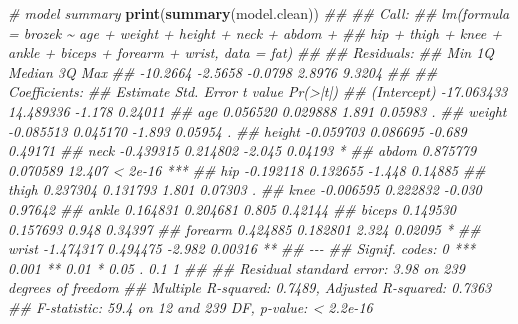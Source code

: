 \documentclass[
]{book}
\newenvironment{Shaded}{\begin{snugshade}}{\end{snugshade}}
\newcommand{\CommentTok}[1]{\textcolor[rgb]{0.56,0.35,0.01}{\textit{#1}}}
\newcommand{\KeywordTok}[1]{\textcolor[rgb]{0.13,0.29,0.53}{\textbf{#1}}}
\newcommand{\NormalTok}[1]{#1}
\theoremstyle{definition}
\theoremstyle{definition}
\theoremstyle{definition}
\theoremstyle{remark}
\begin{document}
\begin{Shaded}
\begin{Highlighting}[]

\CommentTok{\# model summary}
\KeywordTok{print}\NormalTok{(}\KeywordTok{summary}\NormalTok{(model.clean))}
\CommentTok{\#\# }
\CommentTok{\#\# Call:}
\CommentTok{\#\# lm(formula = brozek \textasciitilde{} age + weight + height + neck + abdom + }
\CommentTok{\#\#     hip + thigh + knee + ankle + biceps + forearm + wrist, data = fat)}
\CommentTok{\#\# }
\CommentTok{\#\# Residuals:}
\CommentTok{\#\#      Min       1Q   Median       3Q      Max }
\CommentTok{\#\# {-}10.2664  {-}2.5658  {-}0.0798   2.8976   9.3204 }
\CommentTok{\#\# }
\CommentTok{\#\# Coefficients:}
\CommentTok{\#\#               Estimate Std. Error t value Pr(\textgreater{}|t|)    }
\CommentTok{\#\# (Intercept) {-}17.063433  14.489336  {-}1.178  0.24011    }
\CommentTok{\#\# age           0.056520   0.029888   1.891  0.05983 .  }
\CommentTok{\#\# weight       {-}0.085513   0.045170  {-}1.893  0.05954 .  }
\CommentTok{\#\# height       {-}0.059703   0.086695  {-}0.689  0.49171    }
\CommentTok{\#\# neck         {-}0.439315   0.214802  {-}2.045  0.04193 *  }
\CommentTok{\#\# abdom         0.875779   0.070589  12.407  \textless{} 2e{-}16 ***}
\CommentTok{\#\# hip          {-}0.192118   0.132655  {-}1.448  0.14885    }
\CommentTok{\#\# thigh         0.237304   0.131793   1.801  0.07303 .  }
\CommentTok{\#\# knee         {-}0.006595   0.222832  {-}0.030  0.97642    }
\CommentTok{\#\# ankle         0.164831   0.204681   0.805  0.42144    }
\CommentTok{\#\# biceps        0.149530   0.157693   0.948  0.34397    }
\CommentTok{\#\# forearm       0.424885   0.182801   2.324  0.02095 *  }
\CommentTok{\#\# wrist        {-}1.474317   0.494475  {-}2.982  0.00316 ** }
\CommentTok{\#\# {-}{-}{-}}
\CommentTok{\#\# Signif. codes:  0 \textquotesingle{}***\textquotesingle{} 0.001 \textquotesingle{}**\textquotesingle{} 0.01 \textquotesingle{}*\textquotesingle{} 0.05 \textquotesingle{}.\textquotesingle{} 0.1 \textquotesingle{} \textquotesingle{} 1}
\CommentTok{\#\# }
\CommentTok{\#\# Residual standard error: 3.98 on 239 degrees of freedom}
\CommentTok{\#\# Multiple R{-}squared:  0.7489,	Adjusted R{-}squared:  0.7363 }
\CommentTok{\#\# F{-}statistic:  59.4 on 12 and 239 DF,  p{-}value: \textless{} 2.2e{-}16}


\end{Highlighting}
\end{Shaded}
\end{document}
